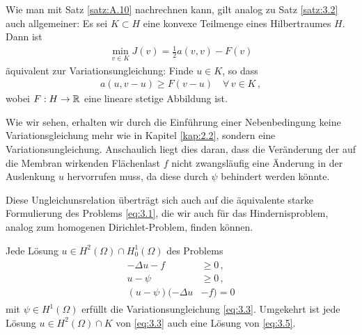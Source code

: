 \begin{bem}\label{bem:3.3}
Wie man mit Satz \ref{satz:A.10} nachrechnen kann, gilt analog zu Satz \ref{satz:3.2} auch allgemeiner: Es sei $K\subset H$ eine konvexe Teilmenge eines Hilbertraumes $H$. Dann ist
\begin{align*}
	\min_{v\in K} J(v) = \frac 1 2 a(v,v)-F(v)
\end{align*}
äquivalent zur Variationsungleichung: Finde $u \in K$, so dass
\begin{align*}
	a(u,v-u) \ge F(v-u) \quad \forall \, v \in K \, ,
\end{align*}
wobei $F :H\rightarrow \mathbb{R}$ eine lineare stetige Abbildung ist.
\end{bem}


Wie wir sehen, erhalten wir durch die Einführung einer Nebenbedingung keine Variationsgleichung mehr wie in Kapitel \ref{kap:2.2}, sondern eine Variationsungleichung. Anschaulich liegt dies daran, dass die Veränderung der auf die Membran wirkenden Flächenlast $f$ nicht zwangsläufig eine Änderung in der Auslenkung $u$ hervorrufen muss, da diese durch $\psi$ behindert werden könnte. 

Diese Ungleichunsrelation überträgt sich auch auf die äquivalente starke Formulierung des Problems \eqref{eq:3.1}, die wir auch für das Hindernisproblem, analog zum homogenen Dirichlet-Problem, finden können.


\begin{satz}\label{satz:3.4} Jede Lösung $u \in H^2(\Omega) \cap H^1_0(\Omega)$ des Problems
\begin{align}\label{eq:3.5}
\begin{aligned}
	-\Delta u -f&\ge 0\, , \\
	u-\psi &\ge 0\, ,  \\
	(u-\psi) (-\Delta u &- f) = 0
\end{aligned}
\end{align}
mit $\psi \in H^1(\Omega)$ erfüllt die Variationsungleichung \eqref{eq:3.3}. Umgekehrt ist jede Lösung $u\in H^2(\Omega) \cap K$ von \eqref{eq:3.3} auch eine Lösung von \eqref{eq:3.5}.
\end{satz}

